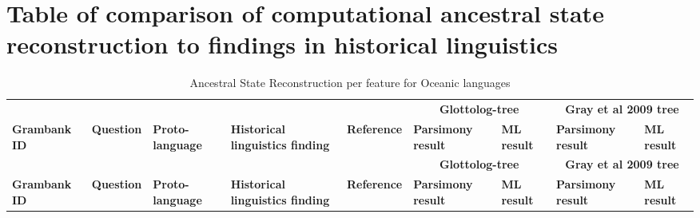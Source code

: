 \documentclass[draft,10pt]{article} %
\begin{document}
\section{Table of comparison of computational ancestral state reconstruction to findings in historical linguistics}
\label{asr_table_appendic}
\singlespacing
\begin{landscape}
\begin{longtable}{| p{2cm}| p{3cm}| p{2.5cm}|p{2cm}|p{2cm}|p{2cm}|p{2cm}|p{2cm}|p{2cm}|}

\caption{{Ancestral State Reconstruction per feature for Oceanic languages}} \label{ASR_comparison_table} \\
\hline
& &&  &&  \multicolumn{2}{c|}{\textbf{Glottolog-tree}} &\multicolumn{2}{c|}{\textbf{Gray et al 2009 tree}}\\ \cline{6-9}
\textbf{Grambank ID}  & \textbf{Question} & \textbf{Proto-language} & \textbf{Historical linguistics finding}& \textbf{Reference} & \textbf{Parsimony result } & \textbf{ML result} & \textbf{Parsimony result } & \textbf{ML result} \\ 

\endfirsthead

\hline
& &&  &&  \multicolumn{2}{c|}{\textbf{Glottolog-tree}} &\multicolumn{2}{c|}{\textbf{Gray et al 2009 tree}}\\ \cline{6-9}
\textbf{Grambank ID}  & \textbf{Question} & \textbf{Proto-language} & \textbf{Historical linguistics finding}& \textbf{Reference} & \textbf{Parsimony result } & \textbf{ML result} & \textbf{Parsimony result } & \textbf{ML result} \\ 
\endhead


\end{longtable}
\end{landscape}
\end{document}
